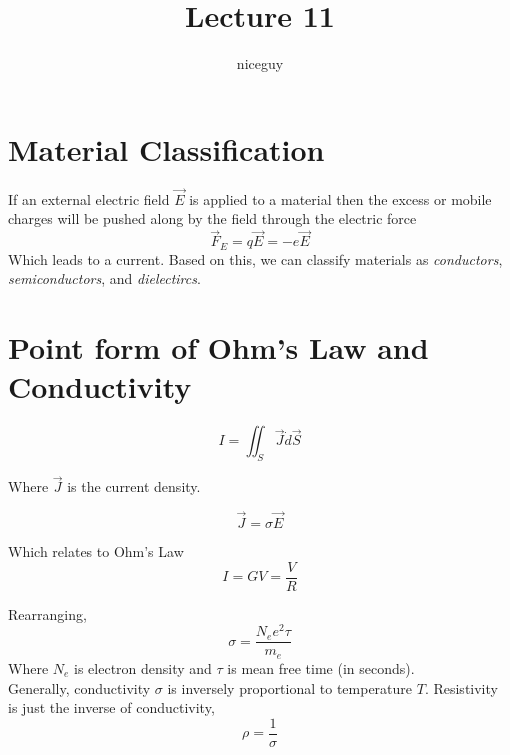 \documentclass[12pt]{article}
\author{niceguy}
\title{Lecture 11}
\begin{document}
\maketitle

\section{Material Classification}
If an external electric field $\vec{E}$ is applied to a material then the excess or mobile charges will be pushed along by the field through the electric force
$$\vec{F}_E = q\vec{E} = -e\vec{E}$$
Which leads to a current. Based on this, we can classify materials as \emph{conductors}, \emph{semiconductors}, and \emph{dielectircs}.

\section{Point form of Ohm's Law and Conductivity}

$$I = \iint_S \vec{J}\dot d\vec{S}$$

Where $\vec{J}$ is the current density.

$$\vec{J} = \sigma\vec{E}$$

Which relates to Ohm's Law
$$I = GV = \frac{V}{R}$$

Rearranging,
$$\sigma = \frac{N_ee^2\tau}{m_e}$$
Where $N_e$ is electron density and $\tau$ is mean free time (in seconds). \\
Generally, conductivity $\sigma$ is inversely proportional to temperature $T$. Resistivity is just the inverse of conductivity,
$$\rho = \frac{1}{\sigma}$$
\end{document}
